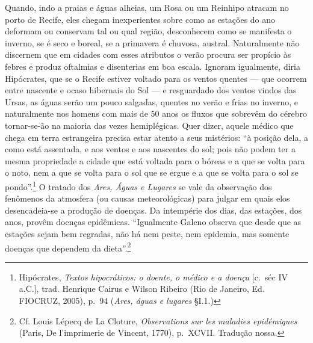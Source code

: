 Quando, indo a praias e águas alheias, um Rosa ou um Reinhipo atracam no
porto de Recife, eles chegam inexperientes sobre como as estações do ano
deformam ou conservam tal ou qual região, desconhecem como se manifesta
o inverno, se é seco e boreal, se a primavera é chuvosa, austral.
Naturalmente não discernem que em cidades com esses atributos o verão
procura ser propício às febres e produz oftalmias e disenterias em boa
escala. Ignoram igualmente, diria Hipócrates, que se o Recife estiver
voltado para os ventos quentes --- que ocorrem entre nascente e ocaso
hibernais do Sol --- e resguardado dos ventos vindos das Ursas, as águas
serão um pouco salgadas, quentes no verão e frias no inverno, e
naturalmente nos homens com mais de 50 anos os fluxos que sobrevêm do
cérebro tornar-se-ão na maioria das vezes hemiplégicas. Quer dizer,
aquele médico que chega em terra estrangeira precisa estar atento a seus
mistérios: ``à posição dela, a como está assentada, e aos ventos e aos
nascentes do sol; pois não podem ter a mesma propriedade a cidade que
está voltada para o bóreas e a que se volta para o noto, nem a que se
volta para o sol que se ergue e a que se volta para o sol se
pondo''.\footnote{Hipócrates, \textit{Textos hipocráticos: o doente, o
  médico e a doença} {[}c.~séc IV a.C.{]}, trad. Henrique Cairus e
  Wilson Ribeiro (Rio de Janeiro, Ed. FIOCRUZ, 2005), p.~94 (\textit{Ares,
  águas e lugares} §I.1.)} O tratado dos \textit{Ares, Águas e Lugares} se
vale da observação dos fenômenos da atmosfera (ou causas meteorológicas)
para julgar em quais elos desencadeia-se a produção de doenças. Da
intempérie dos dias, das estações, dos anos, provêm doenças epidêmicas.
``Igualmente Galeno observa que desde que as estações sejam bem
regradas, não há nem peste, nem epidemia, mas somente doenças que
dependem da dieta''.\footnote{Cf. Louis Lépecq de La Cloture,
  \textit{Observations sur les maladies epidémiques} (Paris, De
  l'imprimerie de Vincent, 1770), p.~XCVII. Tradução nossa.}

